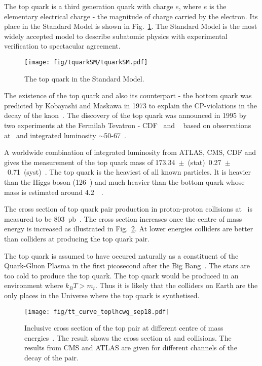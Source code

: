 The top quark is a third generation quark with charge $e$, where $e$ is the elementary electrical charge - the magnitude of charge carried by the electron. Its place in the Standard Model is shown in Fig.~\ref{fig:top_quarkSM}. The Standard Model is the most widely accepted model to describe subatomic physics with experimental verification to spectacular agreement.

\begin{figure}[htpb]
    \centering
    \texttt{[image: fig/tquarkSM/tquarkSM.pdf]}
    \caption{The top quark in the Standard Model.}
    \label{fig:top_quarkSM}
\end{figure}

The existence of the top quark and also its counterpart - the bottom quark was predicted by Kobayashi and Maskawa in 1973 to explain the CP-violations in the decay of the kaon~\cite{Kobayashi:1973fv}. The discovery of the top quark was announced in 1995 by two experiments at the Fermilab Tevatron - CDF~\cite{Abe:1995hr} and \DZERO~\cite{D0:1995jca} based on observations at ~\TeV and integrated luminosity $\sim$50-67~\fbinv.

A worldwide combination of integrated luminosity from ATLAS, CMS, CDF and \DZERO gives the measurement of the top quark mass of 173.34~$\pm$~(stat)~0.27~$\pm$~0.71~(syst)~\GeV. The top quark is the heaviest of all known particles. It is heavier than the Higgs boson (126~\GeV) and much heavier than the bottom quark whose mass is estimated around $4.2$~\GeV~\cite{Hoang:1999ye}.

The cross section of top quark pair production in proton-proton collisions at ~\TeV is measured to be 803~pb~\cite{Sirunyan:2018goh}. The cross section increases once the centre of mass energy is increased as illustrated in Fig.~\ref{fig:tt_curve_toplhcwg_sep18}. At lower energies \Pp\Pap colliders are better than \Pp\Pp colliders at producing the top quark pair.

The top quark is assumed to have occured naturally as a constituent of the Quark-Gluon Plasma in the first picosecond after the Big Bang~\cite{Husdal:2016haj}. The stars are too cold to produce the top quark. The top quark would be produced in an environment where $k_{B}T>m_{t}$. Thus it is likely that the colliders on Earth are the only places in the Universe where the top quark is synthetised.

\begin{figure}[hbtp]
  \centering
  \texttt{[image: fig/tt\_curve\_toplhcwg\_sep18.pdf]}
  \caption{Inclusive cross section of the top pair at different centre of mass energies~\cite{twiki:tt_curve_toplhcwg_sep18}. The result shows the cross section at \Pp\Pp and \Pp\Pap collisions. The results from CMS and ATLAS are given for different channels of the decay of the \ttbar pair.}
  \label{fig:tt_curve_toplhcwg_sep18}
\end{figure}


